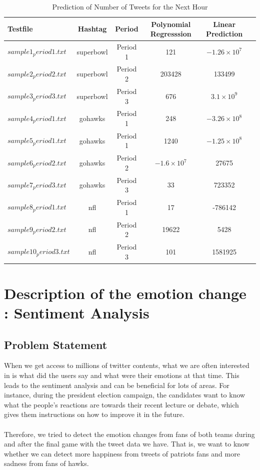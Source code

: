 \documentclass{article}
\begin{document}
\begin{table}
\begin{center}
\caption{Prediction of Number of Tweets for the Next Hour}
\label{tb:p51}
\begin{tabular}{|l||c|c|c|c|c|}
\hline
Testfile & Hashtag & Period  & Polynomial Regresssion& Linear Prediction \\
\hline
$sample1_period1.txt$&superbowl&Period 1&121&$-1.26\times 10^7$\\
$sample2_period2.txt$&superbowl&Period 2&203428&133499\\
$sample3_period3.txt$&superbowl&Period 3&676&$3.1\times 10^9$\\
$sample4_period1.txt$&gohawks&Period 1&248&$-3.26\times 10^8$\\
$sample5_period1.txt$&gohawks&Period 1&1240&$-1.25\times 10^8$\\
$sample6_period2.txt$&gohawks&Period 2&$-1.6\times 10^7$&27675 \\
$sample7_period3.txt$&gohawks&Period 3&33&723352\\
$sample8_period1.txt$&nfl&Period 1&17&-786142\\
$sample9_period2.txt$&nfl&Period 2&19622&5428\\
$sample10_period3.txt$&nfl&Period 3&101&1581925\\
\hline
\end{tabular}
\end{center}
\end{table}

\section{Description of the emotion change : Sentiment Analysis}
\subsection{Problem Statement}
When we get access to millions of twitter contents, what we are often interested in is what did the users say and what were their emotions at that time. This leads to the sentiment analysis and can be beneficial for lots of areas. For instance, during the president election campaign, the candidates want to know what the people's reactions are towards their recent lecture or debate, which gives them instructions on how to improve it in the future.\\
\\
Therefore, we tried to detect the emotion changes from fans of both teams during and after the final game with the tweet data we have. That is, we want to know whether we can detect more happiness from tweets of patriots fans and more sadness from fans of hawks.
\end{document}
